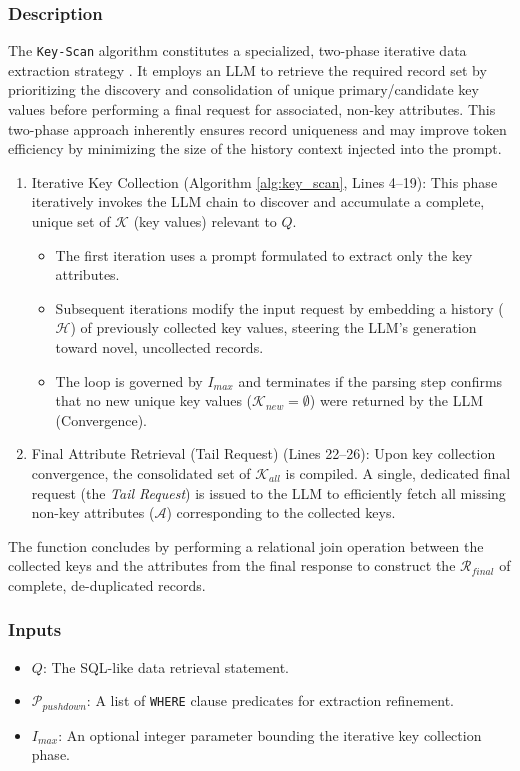 \subsubsection{Description}
The \texttt{Key-Scan} algorithm constitutes a specialized, two-phase iterative data extraction strategy . It employs an LLM to retrieve the required record set by prioritizing the discovery and consolidation of unique primary/candidate key values before performing a final request for associated, non-key attributes. This two-phase approach inherently ensures record uniqueness and may improve token efficiency by minimizing the size of the history context injected into the prompt.

\begin{enumerate}
    \item Iterative Key Collection (Algorithm \ref{alg:key_scan}, Lines 4--19): This phase iteratively invokes the LLM chain to discover and accumulate a complete, unique set of $\mathcal{K}$ (key values) relevant to $Q$.
    \begin{itemize}
        \item The first iteration uses a prompt formulated to extract only the key attributes.
        \item Subsequent iterations modify the input request by embedding a history ($\mathcal{H}$) of previously collected key values, steering the LLM's generation toward novel, uncollected records.
        \item The loop is governed by $I_{max}$ and terminates if the parsing step confirms that no new unique key values ($\mathcal{K}_{new} = \emptyset$) were returned by the LLM (Convergence).
    \end{itemize}
    \item Final Attribute Retrieval (Tail Request) (Lines 22--26): Upon key collection convergence, the consolidated set of $\mathcal{K}_{all}$ is compiled. A single, dedicated final request (the \textit{Tail Request}) is issued to the LLM to efficiently fetch all missing non-key attributes ($\mathcal{A}$) corresponding to the collected keys.
\end{enumerate}
The function concludes by performing a relational join operation between the collected keys and the attributes from the final response to construct the $\mathcal{R}_{final}$ of complete, de-duplicated records.

\subsubsection{Inputs}
\begin{itemize}
    \item $Q$: The SQL-like data retrieval statement.
    \item $\mathcal{P}_{pushdown}$: A list of \texttt{WHERE} clause predicates for extraction refinement.
    \item $I_{max}$: An optional integer parameter bounding the iterative key collection phase.
\end{itemize}

